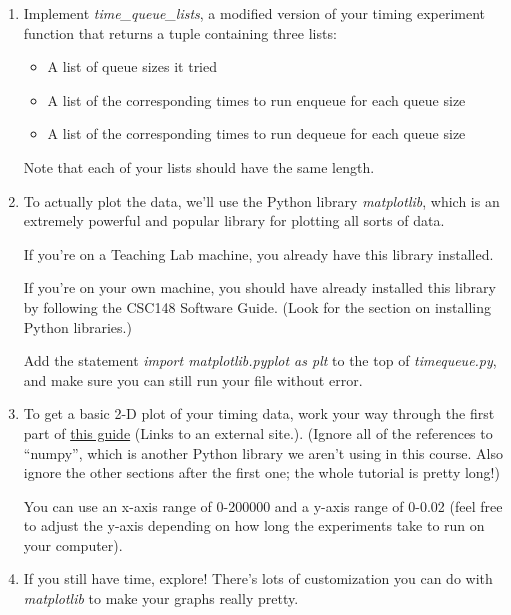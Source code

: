 \documentclass[12pt]{article}
\begin{document}
\begin{enumerate}[1.]
    \item Implement \textit{time\_queue\_lists}, a modified version of your timing
    experiment function that returns a tuple containing three lists:

    \begin{itemize}
        \item A list of queue sizes it tried
        \item A list of the corresponding times to run enqueue for each queue size
        \item A list of the corresponding times to run dequeue for each queue size
    \end{itemize}

    \bigskip

    Note that each of your lists should have the same length.

    \item To actually plot the data, we’ll use the Python library \textit{matplotlib},
    which is an extremely powerful and popular library for plotting all sorts of
    data.

    \bigskip

    If you’re on a Teaching Lab machine, you already have this library installed.

    \bigskip

    If you’re on your own machine, you should have already installed this library
    by following the CSC148 Software Guide. (Look for the section on installing
    Python libraries.)

    \bigskip

    Add the statement \textit{import matplotlib.pyplot as plt} to the top of \textit{timequeue.py},
    and make sure you can still run your file without error.

    \bigskip

    \item To get a basic 2-D plot of your timing data, work your way through the
    first part of \href{https://matplotlib.org/users/pyplot_tutorial.html}{this guide} (Links to an external site.). (Ignore all of the
    references to “numpy”, which is another Python library we aren’t using in this
    course. Also ignore the other sections after the first one; the whole tutorial
    is pretty long!)

    \bigskip

    You can use an x-axis range of 0-200000 and a y-axis range of 0-0.02 (feel
    free to adjust the y-axis depending on how long the experiments take to run
    on your computer).

    \item If you still have time, explore! There’s lots of customization you can
    do with \textit{matplotlib} to make your graphs really pretty.
\end{enumerate}
\end{document}
